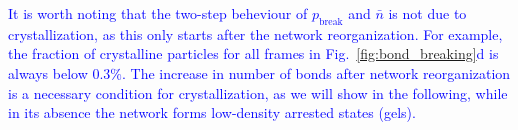 \documentclass[preprint,amsmath,amssymb,superscriptaddress]{revtex4-1}
\begin{document}
\textcolor{blue}{
It is worth noting that the two-step beheviour of $p_\text{break}$ and $\bar{n}$ is not due to crystallization, as this only starts after the network reorganization. For example, the fraction of crystalline particles for all frames in Fig.~\ref{fig:bond_breaking}d is always below $0.3\%$.
The increase in number of bonds after network reorganization is a necessary condition for crystallization, as we will show in the following, while in its absence the network forms low-density arrested states (gels).
 }
 


\end{document}
